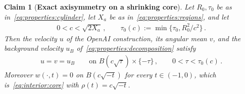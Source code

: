\documentclass[11pt,reqno]{amsproc}
\numberwithin{equation}{section}
\newtheorem{claim}[theorem]{Claim}
\theoremstyle{remark}
\begin{document}
\begin{claim}[{\bf Exact axisymmetry on a shrinking core}]
\label{claim:core}
Let $R_0,\tau_0$ be as in~\eqref{eq:properties:cylinder}, let $X_a$ be as in~\eqref{eq:properties:regions}, and let
\begin{align}
0<c<\sqrt{2X_a}
\,,\qquad
\tau_0(c):=\min\{\tau_0,R_0^2/c^2\}
\,.
\label{eq:properties:core:parameters}
\end{align}
Then the velocity $u$ of the OpenAI construction, its angular mean $v$, and the background velocity $u_B$ of~\eqref{eq:properties:decomposition} satisfy
\begin{align}
u=v=u_B
\qquad\mbox{on }B(c\sqrt\tau)\times\{-\tau\}
\,,\qquad
0<\tau<\tau_0(c)
\,.
\label{eq:properties:core}
\end{align}
Moreover $w(\cdot,t)=0$ on $B(c\sqrt{-t})$ for every $t\in(-1,0)$, which is~\eqref{eq:interior:core} with $\rho(t)=c\sqrt{-t}$.
\end{claim}
\end{document}
